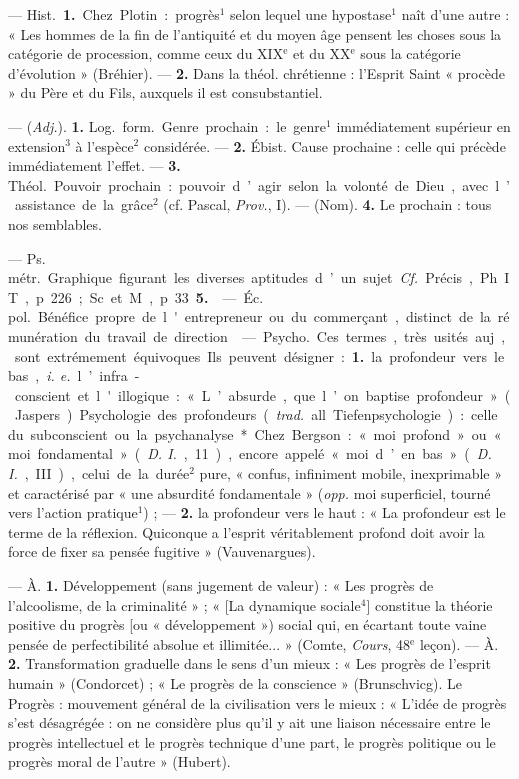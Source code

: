 \begin{itemize}[leftmargin=1cm, label=, itemsep=1pt]
 — \si{Hist.} {\bf 1.} Chez Plotin :
progrès$^1$ selon lequel une hypostase$^1$
naît d’une autre : « Les hommes
de la fin de l'antiquité et du moyen
âge pensent les choses sous la catégorie
de procession, comme ceux
du {\footnotesize XIX}$^\text{e}$ et du {\footnotesize XX}$^\text{e}$ sous la catégorie
d'évolution » (Bréhier). — {\bf 2.} Dans
la théol. chrétienne : l'Esprit Saint
« procède » du Père et du Fils, auxquels il est consubstantiel.

 — ({\it Adj.}). {\bf 1.} \si{Log.} \si{form.}
Genre prochain : le genre$^1$ immédiatement supérieur en extension$^3$
à l'espèce$^2$ considérée. — {\bf 2.} Ébist.
Cause prochaine : celle qui précède
immédiatement l'effet. — {\bf 3.} \si{Théol.}
Pouvoir prochain : pouvoir d’agir
selon la volonté de Dieu, avec l’assistance de la grâce$^2$ (cf. Pascal, {\it Prov.},
I). — (Nom). {\bf 4.} Le prochain : tous
nos semblables.

 — \si{Ps. métr.} Graphique figurant les diverses aptitudes d’un sujet. {\it Cf.} Précis, Ph. IT,
p. 226 ; Sc. et M., p. 33 {\bf 5.}

 — \si{Éc. pol.} Bénéfice propre de
l'entrepreneur ou du commerçant,
distinct de la rémunération du travail de direction.

 — \si{Psycho.} Ces
termes, très usités auj., sont extrémement équivoques. Ils peuvent
désigner : {\bf 1.} la profondeur vers le
bas, {\it i. e.} l’infra-conscient et l'illogique : « L’absurde, que l’on baptise
profondeur » (Jaspers). Psychologie
des profondeurs ({\it trad.} all. Tiefenpsychologie) : celle du subconscient
ou la psychanalyse*. Chez Bergson :
« moi profond » ou « moi fondamental » ({\it D. I.}, 11), encore appelé « moi
d’en bas » ({\it D. I.}, III), celui de la
durée$^2$ pure, « confus, infiniment
mobile, inexprimable » et caractérisé par « une absurdité fondamentale » ({\it opp.} moi superficiel, tourné
vers l’action pratique$^1$) ; — {\bf 2.} la profondeur vers le haut : « La profondeur est le terme de la réflexion.
Quiconque a l'esprit véritablement
profond doit avoir la force de fixer
sa pensée fugitive » (Vauvenargues).

 — À. {\bf 1.} Développement (sans
jugement de valeur) : « Les progrès
de l'alcoolisme, de la criminalité » ;
« [La dynamique sociale$^4$] constitue
la théorie positive du progrès [ou
« développement ») social qui, en
écartant toute vaine pensée de perfectibilité absolue et illimitée... »
(Comte, {\it Cours}, 48$^\text{e}$ leçon). — À. {\bf 2.}
Transformation graduelle dans le
sens d'un mieux : « Les progrès de
l'esprit humain » (Condorcet) ; « Le
progrès de la conscience » (Brunschvicg). Le Progrès : mouvement général de la civilisation vers le mieux :
« L'idée de progrès s’est désagrégée :
on ne considère plus qu'il y ait une
liaison nécessaire entre le progrès
intellectuel et le progrès technique
d'une part, le progrès politique ou
le progrès moral de l’autre » (Hubert).


\end{itemize}
